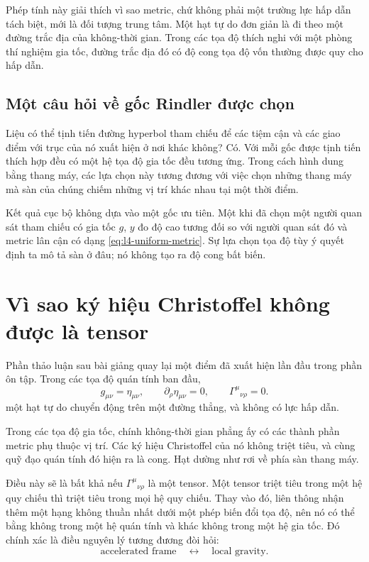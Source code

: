 Phép tính này giải thích vì sao metric, chứ không phải một trường lực hấp dẫn tách biệt, mới là đối tượng trung tâm. Một hạt tự do đơn giản là đi theo một đường trắc địa của không-thời gian. Trong các tọa độ thích nghi với một phòng thí nghiệm gia tốc, đường trắc địa đó có độ cong tọa độ vốn thường được quy cho hấp dẫn.

\subsection{Một câu hỏi về gốc Rindler được chọn}

Liệu có thể tịnh tiến đường hyperbol tham chiếu để các tiệm cận và các giao điểm với trục của nó xuất hiện ở nơi khác không? Có. Với mỗi gốc được tịnh tiến thích hợp đều có một hệ tọa độ gia tốc đều tương ứng. Trong cách hình dung bằng thang máy, các lựa chọn này tương đương với việc chọn những thang máy mà sàn của chúng chiếm những vị trí khác nhau tại một thời điểm.

Kết quả cục bộ không dựa vào một gốc ưu tiên. Một khi đã chọn một người quan sát tham chiếu có gia tốc \(g\), \(y\) đo độ cao tương đối so với người quan sát đó và metric lân cận có dạng \eqref{eq:l4-uniform-metric}. Sự lựa chọn tọa độ tùy ý quyết định ta mô tả sàn ở đâu; nó không tạo ra độ cong bất biến.

\section{Vì sao ký hiệu Christoffel không được là tensor}

Phần thảo luận sau bài giảng quay lại một điểm đã xuất hiện lần đầu trong phần ôn tập. Trong các tọa độ quán tính ban đầu,
\begin{equation}
g_{\mu\nu}=\eta_{\mu\nu},
\qquad
\partial_\rho\eta_{\mu\nu}=0,
\qquad
\Gamma^\mu{}_{\nu\rho}=0.
\end{equation}
một hạt tự do chuyển động trên một đường thẳng, và không có lực hấp dẫn.

Trong các tọa độ gia tốc, chính không-thời gian phẳng ấy có các thành phần metric phụ thuộc vị trí. Các ký hiệu Christoffel của nó không triệt tiêu, và cùng quỹ đạo quán tính đó hiện ra là cong. Hạt dường như rơi về phía sàn thang máy.

Điều này sẽ là bất khả nếu \(\Gamma^\mu{}_{\nu\rho}\) là một tensor. Một tensor triệt tiêu trong một hệ quy chiếu thì triệt tiêu trong mọi hệ quy chiếu. Thay vào đó, liên thông nhận thêm một hạng không thuần nhất dưới một phép biến đổi tọa độ, nên nó có thể bằng không trong một hệ quán tính và khác không trong một hệ gia tốc. Đó chính xác là điều nguyên lý tương đương đòi hỏi:
\begin{equation}
\text{accelerated frame}
\quad\longleftrightarrow\quad
\text{local gravity}.
\end{equation}

